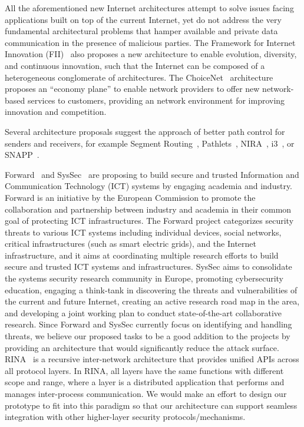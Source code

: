 \documentclass[a4paper]{llncs}
\begin{document}
All the aforementioned new Internet architectures attempt to solve issues
facing applications built on top of the current Internet, yet do not address
the very fundamental architectural problems that hamper available and private
data communication in the presence of malicious parties.  The Framework for
Internet Innovation (FII)~\cite{KSBFGGGMPRRAK2011} also proposes a new
architecture to enable evolution, diversity, and continuous innovation, such
that the Internet can be composed of a heterogeneous conglomerate of
architectures.  The ChoiceNet~\cite{WGCRBN2014} architecture proposes an
``economy plane'' to enable network providers to offer new network-based
services to customers, providing an network environment for improving
innovation and competition.

Several architecture proposals suggest the approach of better path control for
senders and receivers, for example Segment Routing~\cite{segmentrouting},
Pathlets~\cite{GoGaShSt2009}, NIRA~\cite{YanClaBer2007},
i3~\cite{StAdZhShSu2004}, or SNAPP~\cite{PaPeAn2008}.




Forward~\cite{forward-url} and SysSec~\cite{syssec-url} are proposing to build
secure and trusted  Information and Communication Technology (ICT) systems by
engaging academia and industry.  Forward is an initiative by the European
Commission to promote the collaboration and partnership between industry and
academia in their common goal of protecting ICT infrastructures.  The Forward
project categorizes security threats to various ICT systems including
individual devices, social networks, critical infrastructures (such as smart
electric grids), and the Internet infrastructure, and it aims at coordinating
multiple research efforts to build secure and trusted ICT systems and
infrastructures.  SysSec aims to consolidate the systems security research
community in Europe, promoting cybersecurity education, engaging a think-tank
in discovering the threats and vulnerabilities of the current and future
Internet, creating an active research road map in the area, and developing a
joint working plan to conduct state-of-the-art collaborative research.  Since
Forward and SysSec currently focus on identifying and handling
threats, we believe our proposed tasks to be a good addition
to the projects by providing an architecture that would significantly reduce
the attack surface. RINA~\cite{rina-url} is a recursive inter-network
architecture that provides unified APIs across all protocol layers. In RINA,
all layers have the same functions with different scope and range, where a
layer is a distributed application that performs and manages inter-process
communication. We would make an effort to design our prototype to fit into this
paradigm so that our architecture can support seamless integration with other
higher-layer security protocols/mechanisms.
\end{document}
